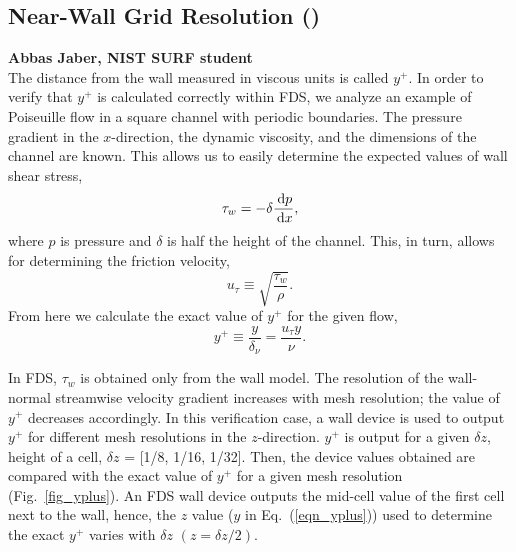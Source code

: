 \documentclass[11pt]{book}
\begin{document}
\clearpage

\subsection{Near-Wall Grid Resolution (\texorpdfstring{}{yplus})}

\textbf{Abbas Jaber, NIST SURF student}\\

\noindent The distance from the wall measured in viscous units is called $y^+$. In order to verify that $y^+$ is calculated correctly within FDS, we analyze an example of Poiseuille flow in a square channel with periodic boundaries. The pressure gradient in the $x$-direction, the dynamic viscosity, and the dimensions of the channel are known. This allows us to easily determine the expected values of wall shear stress,
\begin{equation}
\label{wall stress}
\tau_w = - \delta \frac{\,\mathrm{d} p}{\,\mathrm{d} x},
\end{equation}
where $p$ is pressure and $\delta$ is half the height of the channel. This, in turn, allows for determining the friction velocity,
\begin{equation}
\label{friction velocity}
u_{\tau} \equiv \sqrt{{\frac{\tau_w}{\rho}}}.
\end{equation}
From here we calculate the exact value of $y^+$ for the given flow,
\begin{equation}
\label{eqn_yplus}
y^+ \equiv \frac{y}{\delta_{\nu}} = \frac{u_{\tau}y}{\nu}.
\end{equation}

In FDS, $\tau_w$ is obtained only from the wall model. The resolution of the wall-normal streamwise velocity gradient increases with  mesh resolution; the value of $y^+$ decreases accordingly. In this verification case, a wall device is used to output $y^+$ for different mesh resolutions in the $z$-direction. $y^+$ is output for a given $\delta z$, height of a cell, $\delta z$ = [1/8, 1/16, 1/32]. Then, the device values obtained are compared with the exact value of $y^+$ for a given mesh resolution (Fig.~\ref{fig_yplus}). An FDS wall device outputs the mid-cell value of the first cell next to the wall, hence, the $z$ value ($y$ in Eq.~(\ref{eqn_yplus})) used to determine the exact $y^+$ varies with $\delta z$ $(z = \delta z/2)$.
\end{document}
